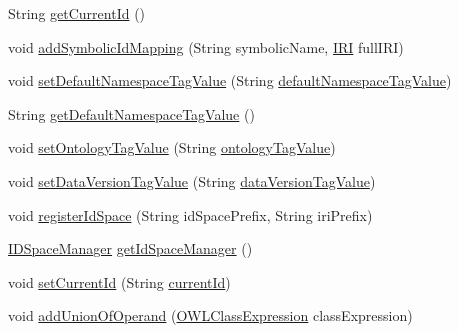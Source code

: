 \begin{DoxyCompactItemize}
String \hyperlink{classorg_1_1coode_1_1owlapi_1_1obo_1_1parser_1_1_o_b_o_consumer_a89962810a25ac89bdf488cc15384b38d}{get\-Current\-Id} ()
\item 
void \hyperlink{classorg_1_1coode_1_1owlapi_1_1obo_1_1parser_1_1_o_b_o_consumer_a12cf28df05f28bea37e2a67603b2bef6}{add\-Symbolic\-Id\-Mapping} (String symbolic\-Name, \hyperlink{classorg_1_1semanticweb_1_1owlapi_1_1model_1_1_i_r_i}{I\-R\-I} full\-I\-R\-I)
\item 
void \hyperlink{classorg_1_1coode_1_1owlapi_1_1obo_1_1parser_1_1_o_b_o_consumer_ab9510dd63012a5a45b6246897118a3d5}{set\-Default\-Namespace\-Tag\-Value} (String \hyperlink{classorg_1_1coode_1_1owlapi_1_1obo_1_1parser_1_1_o_b_o_consumer_aa16e47ddbe06bdb7b6e037f40db5bab3}{default\-Namespace\-Tag\-Value})
\item 
String \hyperlink{classorg_1_1coode_1_1owlapi_1_1obo_1_1parser_1_1_o_b_o_consumer_a8366628cb74f50ed01c0d0ad3e105f84}{get\-Default\-Namespace\-Tag\-Value} ()
\item 
void \hyperlink{classorg_1_1coode_1_1owlapi_1_1obo_1_1parser_1_1_o_b_o_consumer_a751d3a2a5f4e2cfaf29730ed61ec06ff}{set\-Ontology\-Tag\-Value} (String \hyperlink{classorg_1_1coode_1_1owlapi_1_1obo_1_1parser_1_1_o_b_o_consumer_a991771994ca422ffa98eb5ed010c22cb}{ontology\-Tag\-Value})
\item 
void \hyperlink{classorg_1_1coode_1_1owlapi_1_1obo_1_1parser_1_1_o_b_o_consumer_a725a987039b57e660cff2a6dfb2551d2}{set\-Data\-Version\-Tag\-Value} (String \hyperlink{classorg_1_1coode_1_1owlapi_1_1obo_1_1parser_1_1_o_b_o_consumer_a6de5aa6acfa2a5a1175acae375c27f69}{data\-Version\-Tag\-Value})
\item 
void \hyperlink{classorg_1_1coode_1_1owlapi_1_1obo_1_1parser_1_1_o_b_o_consumer_a31204f5861c5428ae5aa81e581139102}{register\-Id\-Space} (String id\-Space\-Prefix, String iri\-Prefix)
\item 
\hyperlink{classorg_1_1coode_1_1owlapi_1_1obo_1_1parser_1_1_i_d_space_manager}{I\-D\-Space\-Manager} \hyperlink{classorg_1_1coode_1_1owlapi_1_1obo_1_1parser_1_1_o_b_o_consumer_a068d2509d0ada51014792138af01e23e}{get\-Id\-Space\-Manager} ()
\item 
void \hyperlink{classorg_1_1coode_1_1owlapi_1_1obo_1_1parser_1_1_o_b_o_consumer_a32c68c44551ad0e46d861681fb800d8d}{set\-Current\-Id} (String \hyperlink{classorg_1_1coode_1_1owlapi_1_1obo_1_1parser_1_1_o_b_o_consumer_a25441533ff64399a869dc01c1526d154}{current\-Id})
\item 
void \hyperlink{classorg_1_1coode_1_1owlapi_1_1obo_1_1parser_1_1_o_b_o_consumer_a60f93062037cc4563da69f500b6012f4}{add\-Union\-Of\-Operand} (\hyperlink{interfaceorg_1_1semanticweb_1_1owlapi_1_1model_1_1_o_w_l_class_expression}{O\-W\-L\-Class\-Expression} class\-Expression)

\end{DoxyCompactItemize}
